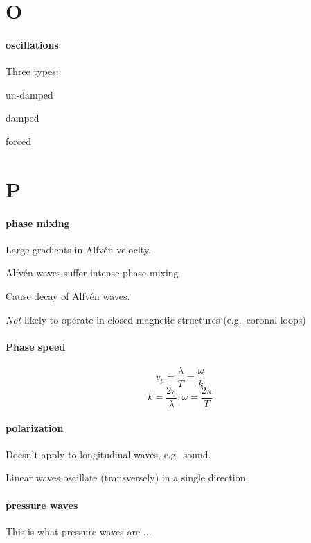 \documentclass[12pt]{article}
\begin{document}
\section*{O}
\paragraph{oscillations}
Three types:
\begin{enumerate*}
    \item un-damped
    \item damped
    \item forced
\end{enumerate*}

\section*{P}

\paragraph{phase mixing}
\begin{itemize*}
    \item Large gradients in Alfv\'en velocity.
    \item Alfv\'en waves suffer intense phase mixing
    \item Cause decay of Alfv\'en waves.
    \item \emph{Not} likely to operate in closed magnetic structures
        (e.g.\ coronal loops)
\end{itemize*}

\paragraph{Phase speed}
$$ v_p = \frac{\lambda}{T} = \frac{\omega}{k} $$
$$ k = \frac{2\pi}{\lambda}, \omega = \frac{2\pi}{T} $$

\paragraph{polarization}
\begin{itemize*}
    \item Doesn't apply to longitudinal waves, e.g.\ sound.
    \item Linear waves oscillate (transversely) in a single direction.
\end{itemize*}

\paragraph{pressure waves}
This is what pressure waves are $\ldots$
\end{document}
